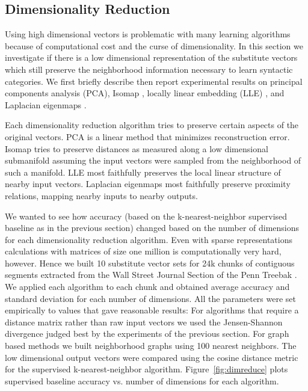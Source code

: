 \subsection{Dimensionality Reduction}
\label{sec:dimreduce}

Using high dimensional vectors is problematic with many learning
algorithms because of computational cost and the curse of
dimensionality.  In this section we investigate if there is a low
dimensional representation of the substitute vectors which still
preserve the neighborhood information necessary to learn syntactic
categories.  We first briefly describe then report experimental
results on principal components analysis (PCA), Isomap
\cite{tenenbaum2000global}, locally linear embedding (LLE)
\cite{roweis2000nonlinear}, and Laplacian eigenmaps
\cite{belkin2003laplacian}.


Each dimensionality reduction algorithm tries to preserve certain
aspects of the original vectors.  PCA is a linear method that
minimizes reconstruction error.  Isomap tries to preserve distances as
measured along a low dimensional submanifold assuming the input
vectors were sampled from the neighborhood of such a manifold.  LLE
most faithfully preserves the local linear structure of nearby input
vectors.  Laplacian eigenmaps most faithfully preserve proximity
relations, mapping nearby inputs to nearby outputs.

We wanted to see how accuracy (based on the k-nearest-neighbor
supervised baseline as in the previous section) changed based on the
number of dimensions for each dimensionality reduction algorithm.  
%
Even with sparse representations calculations with matrices of size
one million is computationally very hard, however.  Hence we built 10
substitute vector sets for 24k chunks of contiguous segments extracted
from the Wall Street Journal Section of the Penn Treebak
\cite{treebank3}.  We applied each algorithm to each chunk and
obtained average accuracy and standard deviation for each number of
dimensions.
%
All the parameters were set empirically to values that gave
reasonable results: For algorithms that require a distance matrix
rather than raw input vectors we used the Jensen-Shannon divergence
judged best by the experiments of the previous section.  For graph
based methods we built neighborhood graphs using 100 nearest
neighbors.  The low dimensional output vectors were compared using the
cosine distance metric for the supervised k-nearest-neighbor
algorithm.  Figure~\ref{fig:dimreduce} plots supervised baseline
accuracy vs. number of dimensions for each algorithm.

